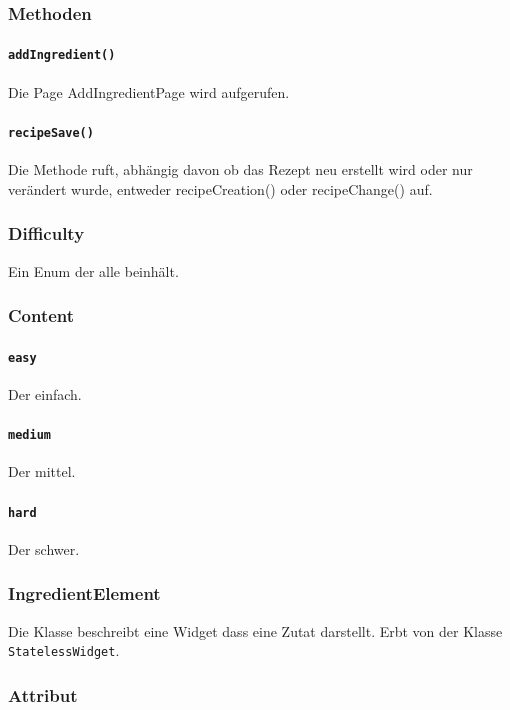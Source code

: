 \documentclass[parskip=full]{scrartcl}
\begin{document}
        \subsubsection*{Methoden}
            \paragraph*{\texttt{addIngredient()}} Die Page AddIngredientPage wird aufgerufen.
            \paragraph*{\texttt{recipeSave()}} Die Methode ruft, abhängig davon ob das Rezept neu erstellt wird oder nur verändert wurde, entweder recipeCreation() oder recipeChange() auf.
        
    \subsubsection{Difficulty}
            Ein Enum der alle  beinhält.
            \subsubsection*{Content}
                \paragraph*{\texttt{easy}} Der  einfach.
                \paragraph*{\texttt{medium}} Der  mittel.
                \paragraph*{\texttt{hard}} Der  schwer.

    \subsubsection*{IngredientElement}
            Die Klasse beschreibt eine Widget dass eine Zutat darstellt. Erbt von der Klasse \texttt{StatelessWidget}.
            \subsubsection*{Attribut}
\end{document}
